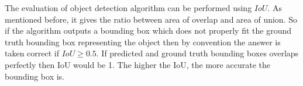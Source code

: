 \documentclass[11pt]{article}
\begin{document}
The evaluation of object detection algorithm can be performed using $IoU$. As mentioned before, it gives the ratio between area of overlap and area of union. So if the algorithm outputs a bounding box which does not properly fit the ground truth bounding box representing the object then by convention the answer is taken correct if $IoU \geq 0.5$. If predicted and ground truth bounding boxes overlaps perfectly then IoU would be 1. The higher the IoU, the more accurate the bounding box is.

\end{document}
